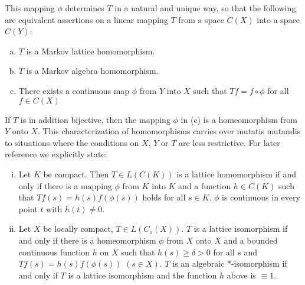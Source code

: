 This mapping $\phi$ determines $T$ in a natural and unique way, so that the following are equivalent assertions on a linear mapping $T$ from a space $C(X)$ into a space $C(Y)$:
\begin{enumerate}[(a)]
\item 
$T$ is a Markov lattice homomorphism.
\item 
$T$ is a Markov algebra homomorphism.
\item 
There exists a continuous map $\phi$ from $Y$ into $X$ such that $Tf = f \circ \phi$ for all $f \in C(X)$
\end{enumerate}
If $T$ is in addition bijective, then the mapping $\phi$ in (c) is a homeomorphism from $Y$ onto $X$.
This characterization of homomorphisms carries over mutatis mutandis to situations where the conditions on $X$, $Y$ or $T$ are less restrictive.
For later reference we explicitly state:
\begin{enumerate}[(i)]
\item Let $K$ be compact. Then $T \in L(C(K))$ is a lattice homomorphism if and only if there is a mapping $\phi$ from $K$ into $K$ and a function
$h \in C(K)$ such that $Tf(s) = h(s)f(\phi(s))$ holds for all $s \in K$.
$\phi$ is continuous in every point $t$ with $h(t) \neq 0$.


\item Let $X$ be locally compact, $T \in L(C_{o}(X))$.
$T$ is a lattice isomorphism if and only if there is a homeomorphism $\phi$ from $X$ onto $X$ and a bounded continuous function $h$ on $X$ such that $h(s) \geq \delta > 0$ for all $s$ and $Tf(s) = h(s)f(\phi(s))$ $(s \in X)$.
$T$ is an algebraic $*$-isomorphism if and only if $T$ is a lattice isomorphism and the function $h$ above is $\equiv 1$.

\end{enumerate}






